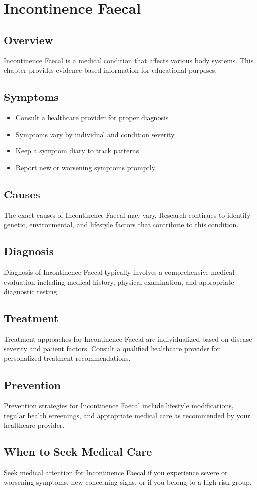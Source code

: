 \chapter{Incontinence Faecal}

\section*{Overview}
Incontinence Faecal is a medical condition that affects various body systems. This chapter provides evidence-based information for educational purposes.

\section*{Symptoms}
\begin{itemize}
  \item Consult a healthcare provider for proper diagnosis
  \item Symptoms vary by individual and condition severity
  \item Keep a symptom diary to track patterns
  \item Report new or worsening symptoms promptly
\end{itemize}

\section*{Causes}
The exact causes of Incontinence Faecal may vary. Research continues to identify genetic, environmental, and lifestyle factors that contribute to this condition.

\section*{Diagnosis}
Diagnosis of Incontinence Faecal typically involves a comprehensive medical evaluation including medical history, physical examination, and appropriate diagnostic testing.

\section*{Treatment}
Treatment approaches for Incontinence Faecal are individualized based on disease severity and patient factors. Consult a qualified healthcare provider for personalized treatment recommendations.

\section*{Prevention}
Prevention strategies for Incontinence Faecal include lifestyle modifications, regular health screenings, and appropriate medical care as recommended by your healthcare provider.

\section*{When to Seek Medical Care}
Seek medical attention for Incontinence Faecal if you experience severe or worsening symptoms, new concerning signs, or if you belong to a high-risk group.
\clearpage
